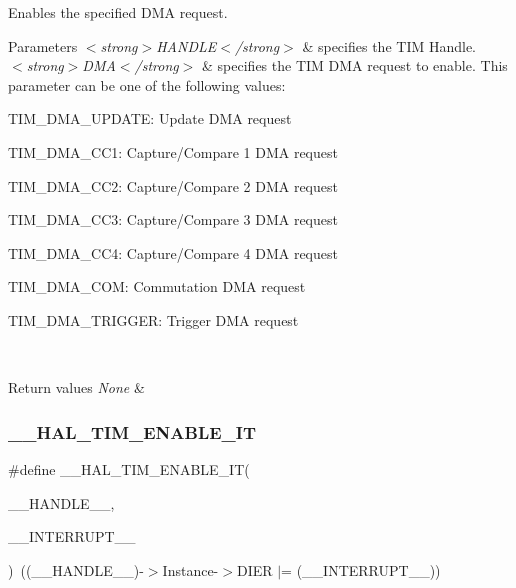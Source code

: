 Enables the specified D\+MA request. 


\begin{DoxyParams}{Parameters}
{\em $<$strong$>$\+H\+A\+N\+D\+L\+E$<$/strong$>$} & specifies the T\+IM Handle. \\
\hline
{\em $<$strong$>$\+D\+M\+A$<$/strong$>$} & specifies the T\+IM D\+MA request to enable. This parameter can be one of the following values\+: \begin{DoxyItemize}
\item T\+I\+M\+\_\+\+D\+M\+A\+\_\+\+U\+P\+D\+A\+TE\+: Update D\+MA request \item T\+I\+M\+\_\+\+D\+M\+A\+\_\+\+C\+C1\+: Capture/\+Compare 1 D\+MA request \item T\+I\+M\+\_\+\+D\+M\+A\+\_\+\+C\+C2\+: Capture/\+Compare 2 D\+MA request \item T\+I\+M\+\_\+\+D\+M\+A\+\_\+\+C\+C3\+: Capture/\+Compare 3 D\+MA request \item T\+I\+M\+\_\+\+D\+M\+A\+\_\+\+C\+C4\+: Capture/\+Compare 4 D\+MA request \item T\+I\+M\+\_\+\+D\+M\+A\+\_\+\+C\+OM\+: Commutation D\+MA request \item T\+I\+M\+\_\+\+D\+M\+A\+\_\+\+T\+R\+I\+G\+G\+ER\+: Trigger D\+MA request \end{DoxyItemize}
\\
\hline
\end{DoxyParams}

\begin{DoxyRetVals}{Return values}
{\em None} & \\
\hline
\end{DoxyRetVals}
\mbox{\label{group___t_i_m___exported___macros_ga4d69943bc4716743c78e3194e259097e}} 
\subsubsection{\texorpdfstring{\+\_\+\+\_\+\+H\+A\+L\+\_\+\+T\+I\+M\+\_\+\+E\+N\+A\+B\+L\+E\+\_\+\+IT}{\_\_HAL\_TIM\_ENABLE\_IT}}
{\footnotesize\ttfamily \#define \+\_\+\+\_\+\+H\+A\+L\+\_\+\+T\+I\+M\+\_\+\+E\+N\+A\+B\+L\+E\+\_\+\+IT(\begin{DoxyParamCaption}\item[{}]{\+\_\+\+\_\+\+H\+A\+N\+D\+L\+E\+\_\+\+\_\+,  }\item[{}]{\+\_\+\+\_\+\+I\+N\+T\+E\+R\+R\+U\+P\+T\+\_\+\+\_\+ }\end{DoxyParamCaption})~((\+\_\+\+\_\+\+H\+A\+N\+D\+L\+E\+\_\+\+\_\+)-\/$>$Instance-\/$>$D\+I\+ER $\vert$= (\+\_\+\+\_\+\+I\+N\+T\+E\+R\+R\+U\+P\+T\+\_\+\+\_\+))}



